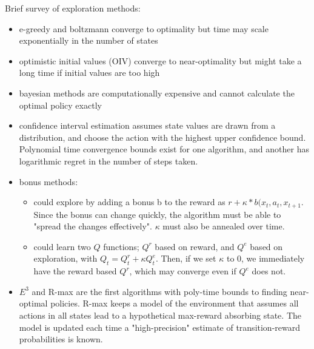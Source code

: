 \documentclass[12pt, oneside]{amsart}
\begin{document}
Brief survey of exploration methods:
\begin{itemize}
	\item e-greedy and boltzmann converge to optimality but time may scale exponentially in the number of states
	\item optimistic initial values (OIV) converge to near-optimality but might take a long time if initial values are too high
	\item bayesian methods are computationally expensive and cannot calculate the optimal policy exactly
	\item confidence interval estimation assumes state values are drawn from a distribution, and choose the action with the highest upper confidence bound. Polynomial time convergence bounds exist for one algorithm, and another has logarithmic regret in the number of steps taken.
	\item bonus methods:
	\begin{itemize}
		\item could explore by adding a bonus b to the reward as $r + \kappa * b(x_t, a_t, x_{t+1}$. Since the bonus can change quickly, the algorithm must be able to "spread the changes effectively". $\kappa$ must also be annealed over time.
		\item could learn two $Q$ functions; $Q^r$ based on reward, and $Q^e$ based on exploration, with $Q_t = Q^r_t + \kappa Q^e_t$. Then, if we set $\kappa$ to 0, we immediately have the reward based $Q^r$, which may converge even if $Q^e$ does not.
	\end{itemize}
	\item $E^3$ and R-max are the first algorithms with poly-time bounds to finding near-optimal policies. R-max keeps a model of the environment that assumes all actions in all states lead to a hypothetical max-reward absorbing state. The model is updated each time a "high-precision" estimate of transition-reward probabilities is known.
\end{itemize}
\end{document}
